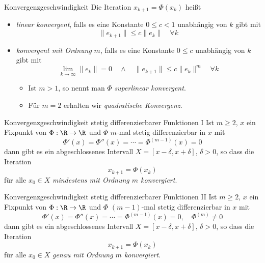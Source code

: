 \begin{defi}{Konvergenzgeschwindigkeit}
    Die Iteration $x_{k+1} = \Phi(x_k)$ heißt
    \begin{itemize}
        \item \emph{linear konvergent}, falls es eine Konstante $0 \leq c < 1$ unabhängig von $k$ gibt mit
              \[
                  \|e_{k+1}\| \leq c \|e_k\| \quad \forall k
              \]
        \item \emph{konvergent mit Ordnung} $m$, falls es eine Konstante $0 \leq c$ unabhängig von $k$ gibt mit
              \[
                  \lim_{k \to \infty} \|e_k\| = 0 \quad \land \quad \|e_{k+1}\| \leq c \|e_k\|^m \quad \forall k
              \]
              \begin{itemize}
                  \item Ist $m > 1$, so nennt man $\Phi$ \emph{superlinear konvergent}.
                  \item Für $m = 2$ erhalten wir \emph{quadratische Konvergenz}.
              \end{itemize}
    \end{itemize}
\end{defi}

\begin{bonus}{Konvergenzgeschwindigkeit stetig differenzierbarer Funktionen I}
    Ist $m \geq 2$, $x$ ein Fixpunkt von $\Phi: \R \to \R$ und $\Phi$ $m$-mal stetig differenzierbar in $x$ mit
    \[
        \Phi'(x) = \Phi''(x) = \cdots = \Phi^{(m-1)}(x) = 0
    \]
    dann gibt es ein abgeschlossenes Intervall $X = [ x - \delta, x + \delta ]$, $\delta > 0$, so dass die Iteration
    \[
        x_{k+1} = \Phi(x_k)
    \]
    für alle $x_0 \in X$ \emph{mindestens mit Ordnung $m$ konvergiert}.
\end{bonus}

\begin{bonus}{Konvergenzgeschwindigkeit stetig differenzierbarer Funktionen II}
    Ist $m \geq 2$, $x$ ein Fixpunkt von $\Phi: \R \to \R$ und $\Phi$ $(m-1)$-mal stetig differenzierbar in $x$ mit
    \[
        \Phi'(x) = \Phi''(x) = \cdots = \Phi^{(m-1)}(x) = 0, \quad \Phi^{(m)} \neq 0
    \]
    dann gibt es ein abgeschlossenes Intervall $X = [ x - \delta, x + \delta ]$, $\delta > 0$, so dass die Iteration
    \[
        x_{k+1} = \Phi(x_k)
    \]
    für alle $x_0 \in X$ \emph{genau mit Ordnung $m$ konvergiert}.
\end{bonus}

